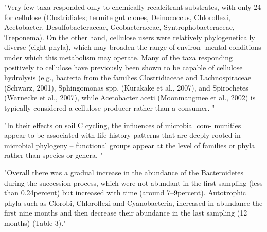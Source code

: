 "Very few taxa responded only to chemically recalcitrant substrates, with only 24 for cellulose (Clostridiales; termite gut clones, Deinococcus, Chloroflexi, Acetobacter, Desulfobacteraceae, Geobacteraceae, Syntrophobacteraceae, Treponema). On the other hand, cellulose users were relatively phylogenetically diverse (eight phyla), which may broaden the range of environ- mental conditions under which this metabolism may operate. Many of the taxa responding positively to cellulose have previously been shown to be capable of cellulose hydrolysis (e.g., bacteria from the families Clostridiaceae and Lachnospiraceae (Schwarz, 2001), Sphingomonas spp. (Kurakake et al., 2007), and Spirochetes (Warnecke et al., 2007), while Acetobacter aceti (Moonmangmee et al., 2002) is typically considered a cellulose producer rather than a consumer. "\cite{Goldfarb_2011}

"In their effects on soil C cycling, the influences of microbial com- munities appear to be associated with life history patterns that are deeply rooted in microbial phylogeny – functional groups appear at the level of families or phyla rather than species or genera. "\cite{Schimel_2012}

"Overall there was a gradual increase in the abundance of the Bacteroidetes during the succession process, which were not abundant in the first sampling (less than 0.24percent) but increased with time (around 7–9percent). Autotrophic phyla such as Clorobi, Chloroflexi and Cyanobacteria, increased in abundance the first nine months and then decrease their abundance in the last sampling (12 months) (Table 3)."\cite{L_pez_Lozano_2013}

